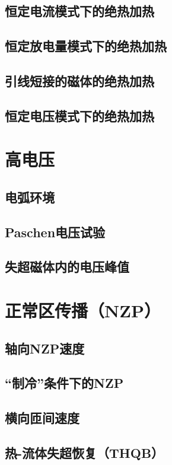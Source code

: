 \subsection{恒定电流模式下的绝热加热}
\subsection{恒定放电量模式下的绝热加热}
\subsection{引线短接的磁体的绝热加热}
\subsection{恒定电压模式下的绝热加热}

\section{高电压}
\subsection{电弧环境}
\subsection{Paschen电压试验}
\subsection{失超磁体内的电压峰值}

\section{正常区传播（NZP）}

\subsection{轴向NZP速度}
\subsection{“制冷”条件下的NZP}
\subsection{横向匝间速度}
\subsection{热-流体失超恢复（THQB）}
